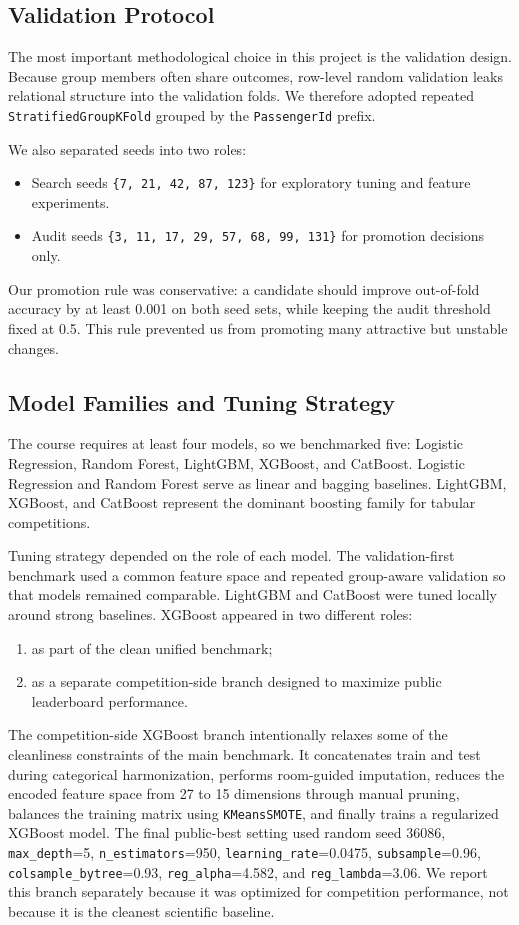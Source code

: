\documentclass[conference]{IEEEtran}
\begin{document}
\subsection{Validation Protocol}
The most important methodological choice in this project is the validation design. Because group members often share outcomes, row-level random validation leaks relational structure into the validation folds. We therefore adopted repeated \texttt{StratifiedGroupKFold} grouped by the \texttt{PassengerId} prefix.

We also separated seeds into two roles:
\begin{itemize}
\item Search seeds \texttt{\{7, 21, 42, 87, 123\}} for exploratory tuning and feature experiments.
\item Audit seeds \texttt{\{3, 11, 17, 29, 57, 68, 99, 131\}} for promotion decisions only.
\end{itemize}

Our promotion rule was conservative: a candidate should improve out-of-fold accuracy by at least 0.001 on both seed sets, while keeping the audit threshold fixed at 0.5. This rule prevented us from promoting many attractive but unstable changes.

\subsection{Model Families and Tuning Strategy}
The course requires at least four models, so we benchmarked five: Logistic Regression, Random Forest, LightGBM, XGBoost, and CatBoost. Logistic Regression and Random Forest serve as linear and bagging baselines. LightGBM, XGBoost, and CatBoost represent the dominant boosting family for tabular competitions.

Tuning strategy depended on the role of each model. The validation-first benchmark used a common feature space and repeated group-aware validation so that models remained comparable. LightGBM and CatBoost were tuned locally around strong baselines. XGBoost appeared in two different roles:
\begin{enumerate}
\item as part of the clean unified benchmark;
\item as a separate competition-side branch designed to maximize public leaderboard performance.
\end{enumerate}

The competition-side XGBoost branch intentionally relaxes some of the cleanliness constraints of the main benchmark. It concatenates train and test during categorical harmonization, performs room-guided imputation, reduces the encoded feature space from 27 to 15 dimensions through manual pruning, balances the training matrix using \texttt{KMeansSMOTE}, and finally trains a regularized XGBoost model. The final public-best setting used random seed 36086, \texttt{max\_depth}=5, \texttt{n\_estimators}=950, \texttt{learning\_rate}=0.0475, \texttt{subsample}=0.96, \texttt{colsample\_bytree}=0.93, \texttt{reg\_alpha}=4.582, and \texttt{reg\_lambda}=3.06. We report this branch separately because it was optimized for competition performance, not because it is the cleanest scientific baseline.
\end{document}
